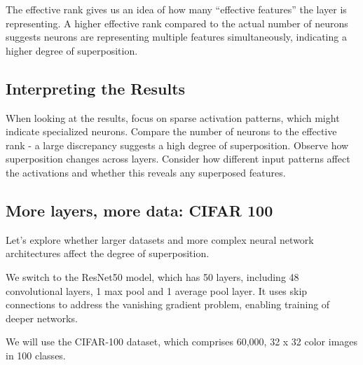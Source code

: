 \documentclass[
  letterpaper,
  DIV=11,
  numbers=noendperiod]{scrreprt}
\begin{document}
The effective rank gives us an idea of how many ``effective features''
the layer is representing. A higher effective rank compared to the
actual number of neurons suggests neurons are representing multiple
features simultaneously, indicating a higher degree of superposition.

\subsection{Interpreting the Results}\label{interpreting-the-results}

When looking at the results, focus on sparse activation patterns, which
might indicate specialized neurons. Compare the number of neurons to the
effective rank - a large discrepancy suggests a high degree of
superposition. Observe how superposition changes across layers. Consider
how different input patterns affect the activations and whether this
reveals any superposed features.

\subsection{More layers, more data: CIFAR
100}\label{more-layers-more-data-cifar-100}

Let's explore whether larger datasets and more complex neural network
architectures affect the degree of superposition.

We switch to the ResNet50 model, which has 50 layers, including 48
convolutional layers, 1 max pool and 1 average pool layer. It uses skip
connections to address the vanishing gradient problem, enabling training
of deeper networks.

We will use the CIFAR-100 dataset, which comprises 60,000, 32 x 32 color
images in 100 classes.
\end{document}
